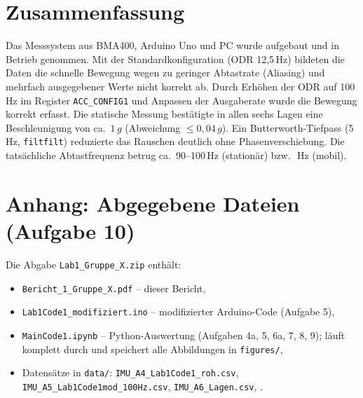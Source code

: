 \documentclass[a4paper,oneside,10pt]{article}
\begin{document}
\section{Zusammenfassung}
Das Messsystem aus BMA400, Arduino Uno und PC wurde aufgebaut und in Betrieb genommen.
Mit der Standardkonfiguration (ODR 12{,}5\,Hz) bildeten die Daten die schnelle
Bewegung wegen zu geringer Abtastrate (Aliasing) und mehrfach ausgegebener Werte
nicht korrekt ab. Durch Erhöhen der ODR auf 100\,Hz im Register \texttt{ACC\_CONFIG1}
und Anpassen der Ausgaberate wurde die Bewegung korrekt erfasst. Die statische Messung
bestätigte in allen sechs Lagen eine Beschleunigung von ca.\ $1\,g$ (Abweichung
$\leq 0{,}04\,g$). Ein Butterworth-Tiefpass (5\,Hz, \texttt{filtfilt}) reduzierte das
Rauschen deutlich ohne Phasenverschiebung. Die tatsächliche Abtastfrequenz betrug
ca.\ 90--100\,Hz (stationär) bzw.\ \,Hz (mobil).




\appendix
\section{Anhang: Abgegebene Dateien (Aufgabe 10)}
\label{sec:anhang}
Die Abgabe \texttt{Lab1\_Gruppe\_X.zip}  enthält:
\begin{itemize}
  \item \texttt{Bericht\_1\_Gruppe\_X.pdf} -- dieser Bericht,
  \item \texttt{Lab1Code1\_modifiziert.ino} -- modifizierter Arduino-Code (Aufgabe 5),
  \item \texttt{MainCode1.ipynb} -- Python-Auswertung (Aufgaben 4a, 5, 6a, 7, 8, 9); läuft komplett durch und speichert alle Abbildungen in \texttt{figures/},
  \item Datensätze in \texttt{data/}: \texttt{IMU\_A4\_Lab1Code1\_roh.csv}, \texttt{IMU\_A5\_Lab1Code1mod\_100Hz.csv}, \texttt{IMU\_A6\_Lagen.csv}, .
\end{itemize}
\end{document}
